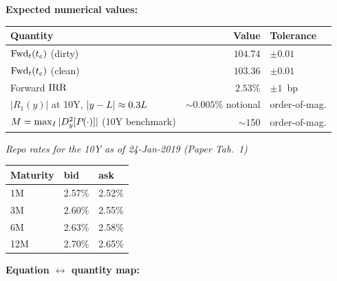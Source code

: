 \documentclass[11pt,a4paper]{article}
\begin{document}
\begin{validation}
\textbf{Expected numerical values:}

\smallskip
\begin{tabular}{@{}p{6cm}rl@{}}
\toprule
Quantity                                                              & Value                      & Tolerance \\
\midrule
$\mathrm{Fwd}_{t}(t_e)$ (dirty)                                              & $104.74$                   & $\pm 0.01$ \\
$\mathrm{Fwd}_{t}(t_e)$ (clean)                                              & $103.36$                   & $\pm 0.01$ \\
Forward $\mathrm{IRR}$                                                        & $2.53\%$                   & $\pm 1$~bp \\
$|R_1(y)|$ at 10Y, $|y-L| \approx 0.3L$                       & $\sim 0.005\%$ notional    & order-of-mag. \\
$M = \max_I |D_{y}^{2}[P_{}(\cdot)]|$ (10Y benchmark)            & $\sim 150$                 & order-of-mag. \\
\bottomrule
\end{tabular}
\smallskip

\begin{center}
\textit{Repo rates for the 10Y as of 24-Jan-2019 (Paper Tab.~1)}\\[2pt]
\begin{tabular}{@{}lll@{}}
\toprule
Maturity & bid    & ask    \\
\midrule
1M       & 2.57\% & 2.52\% \\
3M       & 2.60\% & 2.55\% \\
6M       & 2.63\% & 2.58\% \\
12M      & 2.70\% & 2.65\% \\
\bottomrule
\end{tabular}
\label{tab:repo-jan2019}
\end{center}

\textbf{Equation $\leftrightarrow$ quantity map:}


\end{validation}
\end{document}
